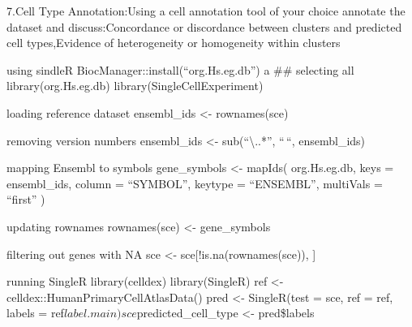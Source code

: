 \documentclass[
  ignorenonframetext,
]{beamer}
\begin{document}
\begin{frame}{7.Cell Type Annotation:Using a cell annotation tool of
your choice annotate the dataset and discuss:Concordance or discordance
between clusters and predicted cell types,Evidence of heterogeneity or
homogeneity within clusters}
\label{cell-type-annotationusing-a-cell-annotation-tool-of-your-choice-annotate-the-dataset-and-discussconcordance-or-discordance-between-clusters-and-predicted-cell-typesevidence-of-heterogeneity-or-homogeneity-within-clusters}
\begin{block}{using sindleR}
\label{using-sindler}
BiocManager::install(``org.Hs.eg.db'') a \#\# selecting all
library(org.Hs.eg.db) library(SingleCellExperiment)
\end{block}

\begin{block}{loading reference dataset}
\label{loading-reference-dataset}
ensembl\_ids \textless- rownames(sce)
\end{block}

\begin{block}{removing version numbers}
\label{removing-version-numbers}
ensembl\_ids \textless- sub(``\textbackslash..*'', ``\,``, ensembl\_ids)
\end{block}

\begin{block}{mapping Ensembl to symbols}
\label{mapping-ensembl-to-symbols}
gene\_symbols \textless- mapIds( org.Hs.eg.db, keys = ensembl\_ids,
column = ``SYMBOL'', keytype = ``ENSEMBL'', multiVals = ``first'' )
\end{block}

\begin{block}{updating rownames}
\label{updating-rownames}
rownames(sce) \textless- gene\_symbols
\end{block}

\begin{block}{filtering out genes with NA}
\label{filtering-out-genes-with-na}
sce \textless- sce{[}!is.na(rownames(sce)), {]}
\end{block}

\begin{block}{running SingleR}
\label{running-singler}
library(celldex) library(SingleR) ref \textless-
celldex::HumanPrimaryCellAtlasData() pred \textless- SingleR(test = sce,
ref = ref, labels = ref\(label.main)
sce\)predicted\_cell\_type \textless- pred\$labels
\end{block}


\end{frame}
\end{document}
